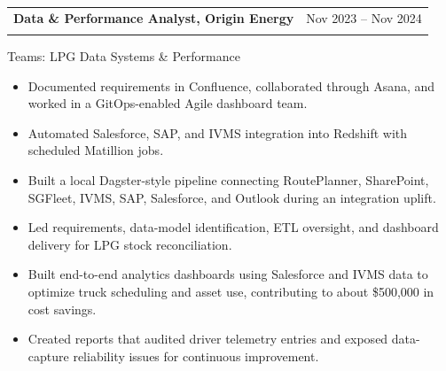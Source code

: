 \documentclass[10pt,a4paper]{article}
\makeatletter
\newenvironment{resumejob}[3]{
  \par\addvspace{0.45em}
  \noindent\begin{tabularx}{\textwidth}{@{}>{\raggedright\arraybackslash}X>{\raggedleft\arraybackslash}p{0.3\textwidth}@{}}
    \textbf{\textcolor{textdark}{#1}} & \textcolor{mutedtext}{#2} \\
    \multicolumn{2}{@{}l@{}}{\textit{\textcolor{mutedtext}{#3}}}
  \end{tabularx}
  \vspace{-0.55em}
}{
  \par\addvspace{0.2em}
}
\makeatother
\begin{document}
\begin{resumejob}{Data \& Performance Analyst, Origin Energy}{Nov 2023 -- Nov 2024}{Melbourne}
Teams: LPG Data Systems \& Performance
\begin{itemize}
  \item Documented requirements in Confluence, collaborated through Asana, and worked in a GitOps-enabled Agile dashboard team.
  \item Automated Salesforce, SAP, and IVMS integration into Redshift with scheduled Matillion jobs.
  \item Built a local Dagster-style pipeline connecting RoutePlanner, SharePoint, SGFleet, IVMS, SAP, Salesforce, and Outlook during an integration uplift.
  \item Led requirements, data-model identification, ETL oversight, and dashboard delivery for LPG stock reconciliation.
  \item Built end-to-end analytics dashboards using Salesforce and IVMS data to optimize truck scheduling and asset use, contributing to about \$500,000 in cost savings.
  \item Created reports that audited driver telemetry entries and exposed data-capture reliability issues for continuous improvement.
\end{itemize}
\end{resumejob}
\end{document}
